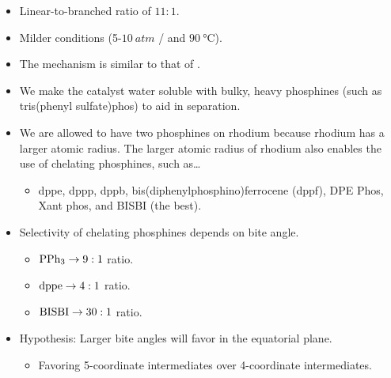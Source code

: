 \documentclass[../notes.tex]{subfiles}
\begin{document}
\begin{itemize}
\begin{itemize}
        \item Linear-to-branched ratio of $11:1$.
        \item Milder conditions (5-$\SI{10}{atm}$  /  and $\SI{90}{\celsius}$).
        \item The mechanism is similar to that of .
        \item We make the catalyst water soluble with bulky, heavy phosphines (such as tris(phenyl sulfate)phos) to aid in separation.
        \item We are allowed to have two phosphines on rhodium because rhodium has a larger atomic radius. The larger atomic radius of rhodium also enables the use of chelating phosphines, such as\dots
        \begin{itemize}
            \item dppe, dppp, dppb, bis(diphenylphosphino)ferrocene (dppf), DPE Phos, Xant phos, and BISBI (the best).
        \end{itemize}
        \item Selectivity of chelating phosphines depends on bite angle.
        \begin{itemize}
            \item $\ce{PPh3}\to 9:1$ ratio.
            \item $\ce{dppe}\to 4:1$ ratio.
            \item $\ce{BISBI}\to 30:1$ ratio.
        \end{itemize}
        \item Hypothesis: Larger bite angles will favor  in the equatorial plane.
        \begin{itemize}
            \item Favoring 5-coordinate intermediates over 4-coordinate intermediates.
        \end{itemize}
    \end{itemize}
\end{itemize}
\end{document}
